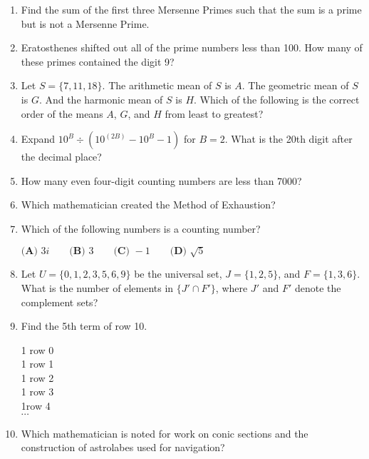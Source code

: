 \documentclass[../uilmath.tex]{subfiles}
\begin{document}
\begin{enumerate}[label=\bfseries\arabic*.]
    \item %
    Find the sum of the first three Mersenne Primes such that the sum is a prime but is not a Mersenne Prime.

    \item %
    Eratosthenes shifted out all of the prime numbers less than 100. How many of these primes contained the digit 9?

    \item %
    Let $S=\{7,11,18\}$. The arithmetic mean of $S$ is $A$. The geometric mean of $S$ is $G$. And the harmonic mean of $S$ is $H$.
    Which of the following is the correct order of the means $A$, $G$, and $H$ from least to greatest?

    \item %
    Expand $10^B \div (10^{(2B)}-10^B-1)$ for $B=2$. What is the 20th digit after the decimal place?

    \item %
    How many even four-digit counting numbers are less than 7000?

    \item %
    Which mathematician created the Method of Exhaustion?

    \item %
    Which of the following numbers is a counting number?

    $\textbf{(A) } 3i \qquad \textbf{(B) } 3 \qquad \textbf{(C) } -1 \qquad \textbf{(D) } \sqrt{5}$

    \item %
    Let $U=\{0,1,2,3,5,6,9\}$ be the universal set, $J=\{1,2,5\}$, and $F=\{1,3,6\}$. What is the number of elements in $\{J' \cap F'\}$, where $J'$ and $F'$ denote the complement sets?

    \item %
    Find the 5th term of row 10.
    \begin{center}
        1 \qquad row 0\\
        1  \qquad row 1\\
        1   \qquad row 2\\
        1    \qquad row 3\\
        1\qquad row 4\\
        $\cdots$ 
    \end{center}

    \item %
    Which mathematician is noted for work on conic sections and the construction of astrolabes used for navigation?


\end{enumerate}
\end{document}
